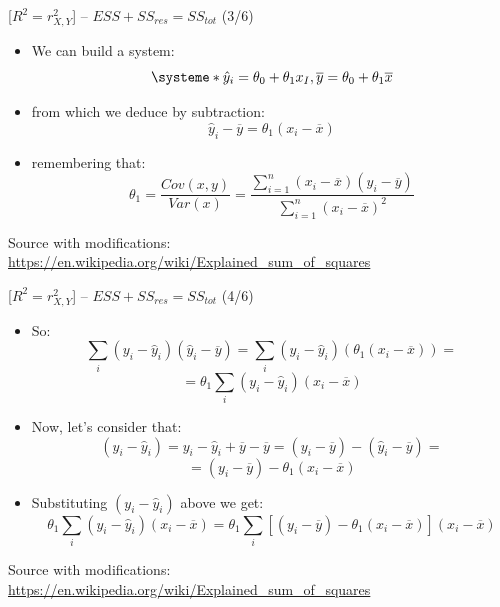 \documentclass{beamer}
\begin{document}
\begin{frame}
{\centerline{ [$R^2 = r_{X,Y}^2$] -- $ESS + SS_{res} = SS_{tot} $ (3/6)}}

\begin{itemize}
\item We can build a system:
\[
\systeme*{
\hat{y}_i = \theta_0 + \theta_{1} x_{I},
\overline{y} = \theta_0 + \theta_1 \overline{x}
}
\]
\item from which we deduce by subtraction:
$$\hat{y}_i - \overline{y} = \theta_1 (x_i - \overline{x})$$
\item remembering that:
$$ \theta_1  = \frac { Cov(x,y)} { Var(x) } = {\frac {\sum _{i=1}^{n}(x_{i}-{\overline {x}})(y_{i}-{\overline {y}})}{\sum _{i=1}^{n}(x_{i}-{\overline {x}})^{2}}}$$
\end{itemize}

\begin{center}
\tiny
Source with modifications: \url{https://en.wikipedia.org/wiki/Explained_sum_of_squares}
\end{center}

\end{frame}



\begin{frame}
{\centerline{ [$R^2 = r_{X,Y}^2$] -- $ESS + SS_{res} = SS_{tot} $ (4/6)}}

\begin{itemize}
\item So:
$$\sum_i(y_{i}-{\hat {y}}_{i})({\hat {y}}_{i}-{\overline {y}}) = \sum_i(y_{i}-{\hat {y}}_{i})(\theta_1 (x_i - \overline{x}))=$$
$$= \theta_1 \sum_i(y_{i}-{\hat {y}}_{i})(x_i - \overline{x})$$
\item Now, let's consider that:
$$(y_{i}-{\hat {y}}_{i})= y_{i}-{\hat {y}}_{i} + \overline {y} - \overline {y} = (y_{i}-{\overline {y}})-({\hat {y}}_{i}-{\overline {y}})= $$
$$ = (y_{i}-{\overline {y}})-{\theta_1}(x_{i}-{\overline {x}})$$
\item Substituting $(y_{i}-{\hat {y}}_{i})$ above we get:
$$ \theta_1 \sum_i(y_{i}-{\hat {y}}_{i})(x_i - \overline{x})=\theta_1 \sum_i[(y_{i}-{\overline {y}})-{\theta_1}(x_{i}-{\overline {x}}) ](x_i - \overline{x}) $$


\end{itemize}

\begin{center}
\tiny 
Source with modifications: \url{https://en.wikipedia.org/wiki/Explained_sum_of_squares}
\end{center}

\end{frame}
\end{document}
